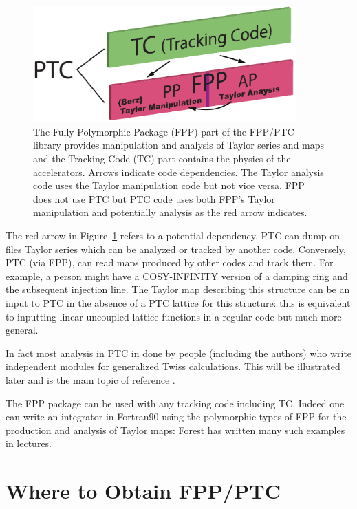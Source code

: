 \documentclass{hitec}     %
\newcommand{\Section}[1]{\section{#1}\vspace*{-1ex}}
\begin{document}
{{{\begin{figure}[tb]
  \centering
  \includegraphics[width=0.9\textwidth]{ptcfppe.pdf}
  \caption{
The Fully Polymorphic Package (FPP) part of the FPP/PTC library provides manipulation and analysis
of Taylor series and maps and the Tracking Code (TC) part contains the physics of 
 the  accelerators. Arrows indicate code dependencies. The Taylor analysis code uses
the Taylor manipulation code but not vice versa. FPP does not use PTC but PTC code uses both FPP's
Taylor manipulation and potentially analysis as the red arrow indicates.
  }
  \label{f:ptc}
\end{figure}

The red arrow in Figure~\ref{f:ptc} refers to a potential dependency. PTC can dump on files Taylor series which can be analyzed or tracked by another code. Conversely, PTC (via FPP), can read maps produced by other codes and track them. For example, a person might have a COSY-INFINITY version of a damping ring and the subsequent injection line. The Taylor map describing this structure can be an input to PTC in the absence of a PTC lattice for this structure: this is equivalent to inputting linear uncoupled lattice functions in a regular code but much more general.


In fact most analysis in PTC in done by people (including the authors) who write independent modules for generalized Twiss calculations. This will be illustrated later and is the main topic of reference \cite{thenewbook}.


The FPP package can be used with any  tracking code including TC. Indeed one can  write an integrator in Fortran90 using the polymorphic types of FPP for the production and analysis of Taylor maps: Forest has written many such examples in lectures.



\Section{Where to Obtain FPP/PTC}
\label{s:obtain}

}}}
\end{document}
